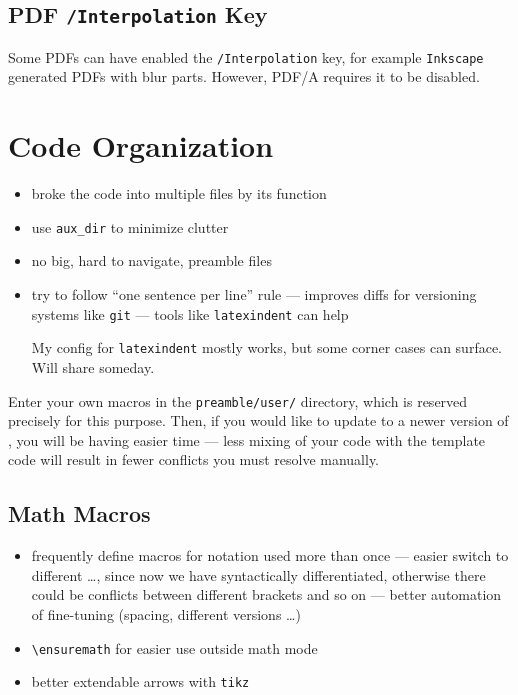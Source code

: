\subsection{PDF \texorpdfstring{\texttt{/Interpolation}}{/Interpolation} Key}%
\label{sub:PDF Interpolation Key}

Some PDFs can have enabled the \texttt{/Interpolation} key, for example \texttt{Inkscape} generated PDFs with blur parts.
However, PDF/A requires it to be disabled.


\section{Code Organization}%
\label{sec:Code Organization}

\begin{itemize}
    \item broke the code into multiple files by its function
    \item use \verb|aux_dir| to minimize clutter
    \item no big, hard to navigate, preamble files
    \item try to follow \enquote{one sentence per line} rule --- improves diffs for versioning systems like \texttt{git} --- tools like \texttt{latexindent} can help
          \begin{Note}
              My config for \texttt{latexindent} mostly works, but some corner cases can surface.
              Will share someday.
          \end{Note}
\end{itemize}

\begin{remark}
    Enter your own macros in the \texttt{preamble/user/} directory, which is reserved precisely for this purpose.
    Then, if you would like to update to a newer version of \TeXtured{}, you will be having easier time --- less mixing of your code with the template code will result in fewer conflicts you must resolve manually.
\end{remark}


\subsection{Math Macros}%
\label{sub Macros}

\begin{itemize}
    \item frequently define macros for notation used more than once
          --- easier switch to different \ldots, since now we have syntactically differentiated,
          otherwise there could be conflicts between different brackets and so on
          --- better automation of fine-tuning (spacing, different versions \ldots)
    \item \verb|\ensuremath| for easier use outside math mode
    \item better extendable arrows with \texttt{tikz}
\end{itemize}


